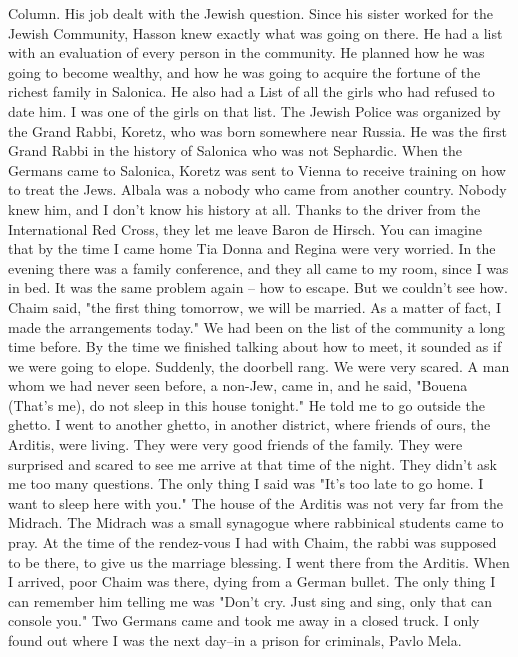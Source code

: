 Column.
His job dealt with the Jewish question.
Since his sister 
worked for the Jewish Community, Hasson knew exactly what was going on 
there.
He had a list with an evaluation of every person in the community.
He planned how he was going to become wealthy, and how he was going to acquire the fortune of the richest family in Salonica.
He also had a List of all the girls who had refused to date him.
I was one of 
the girls on that list.
The Jewish Police was organized by the Grand Rabbi, Koretz, who was 
born somewhere near Russia.
He was the first Grand Rabbi in the history 
of Salonica who was not Sephardic.
When the Germans came to Salonica, 
Koretz was sent to Vienna to receive training on how to treat the Jews.
Albala was a nobody who came from another country.
Nobody knew him, 
and I don't know his history at all.
Thanks to the driver from the International Red Cross, they let 
me leave Baron de Hirsch.
You can imagine that by the time I came  
home Tia Donna and Regina were very worried.
In the evening there was 
a family conference, and they all came to my room, since I was in bed.
It was the same problem again -- how to escape.
But we couldn't see 
how.
Chaim said, "the first thing tomorrow, we will be married.
As a 
matter of fact, I made the arrangements today."
We had been on the list 
of the community a long time before.
By the time we finished talking 
about how to meet, it sounded as if we were going to elope.
Suddenly, the doorbell rang.
We were very scared.
A man whom we 
had never seen before, a non-Jew, came in, and he said, "Bouena (That's 
me), do not sleep in this house tonight."
He told me to go outside the 
ghetto.
I went to another ghetto, in another district, where friends 
of ours, the Arditis, were living.
They were very good friends of the 
family.
They were surprised and scared to see me arrive at that time of 
the night.
They didn't ask me too many questions.
The only thing 
I said was "It's too late to go home.
I want to sleep here 
with you."
The house of the Arditis was not very far from the Midrach.
The 
Midrach was a small synagogue where rabbinical students came to pray.
At the time of the rendez-vous I had with Chaim, the rabbi was supposed 
to be there, to give us the marriage blessing.
I went there from the 
Arditis.
When I arrived, poor Chaim was there, dying from a German bullet.
The only thing I can remember him telling me was "Don't cry.
Just 
sing and sing, only that can console you."
Two Germans came and took me 
away in a closed truck.
I only found out where I was the next day--in 
a prison for criminals, Pavlo Mela.
